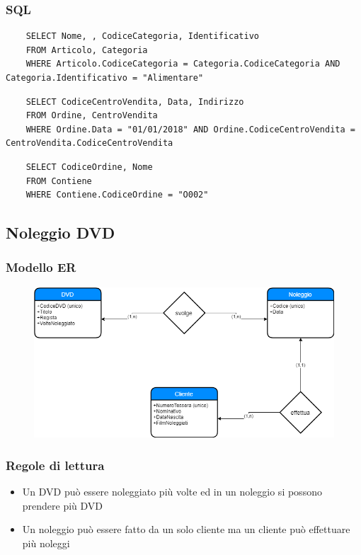 \documentclass{article}
\begin{document}
	\subsubsection{SQL}
	\begin{verbatim}
	SELECT Nome, , CodiceCategoria, Identificativo
	FROM Articolo, Categoria
	WHERE Articolo.CodiceCategoria = Categoria.CodiceCategoria AND Categoria.Identificativo = "Alimentare"
	\end{verbatim}
	\begin{verbatim}
	SELECT CodiceCentroVendita, Data, Indirizzo
	FROM Ordine, CentroVendita
	WHERE Ordine.Data = "01/01/2018" AND Ordine.CodiceCentroVendita = CentroVendita.CodiceCentroVendita
	\end{verbatim}
	\begin{verbatim}
	SELECT CodiceOrdine, Nome
	FROM Contiene
	WHERE Contiene.CodiceOrdine = "O002"
	\end{verbatim}

	\pagebreak
	
	\subsection{Noleggio DVD}
	\subsubsection{Modello ER}
	\begin{figure}[h!]
		\centering
		\includegraphics[scale=0.5]{images/NoleggioDVD.png}
	\end{figure}
	\subsubsection{Regole di lettura}
	\begin{itemize}
		\item Un DVD può essere noleggiato più volte ed in un noleggio si possono prendere più DVD
		\item Un noleggio può essere fatto da un solo cliente ma un cliente può effettuare più noleggi
	\end{itemize}
\end{document}

